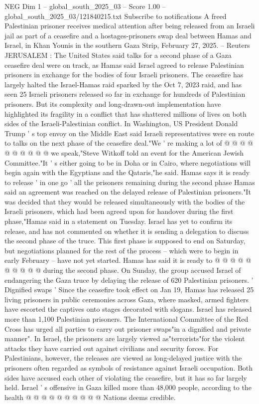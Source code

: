 \begin{textsample}{NEG Dim 1 – global\_south\_2025\_03 – Score 1.00 – global\_south\_2025\_03/121840215.txt}  \label{ex:f1_neg_161}
Subscribe to notifications A freed Palestinian prisoner receives medical attention after being released from an Israeli jail as part of a ceasefire and a hostages-prisoners swap deal between Hamas and Israel, in Khan Younis in the southern Gaza Strip, February 27, 2025. -- Reuters JERUSALEM : The United States said talks for a second phase of a Gaza ceasefire deal were on track, as Hamas said Israel agreed to release Palestinian prisoners in exchange for the bodies of four Israeli prisoners.
The ceasefire has largely halted the Israel-Hamas raid sparked by the Oct 7, 2023 raid, and has seen 25 Israeli prisoners released so far in exchange for hundreds of Palestinian prisoners.
But its complexity and long-drawn-out implementation have highlighted its fragility in a conflict that has shattered millions of lives on both sides of the Israeli-Palestinian conflict.
In Washington, US President Donald Trump ' s top envoy on the Middle East said Israeli representatives were en route to talks on the next phase of the ceasefire deal."We ' re making a lot of @ @ @ @ @ @ @ @ @ @ we speak,"Steve Witkoff told an event for the American Jewish Committee."It ' s either going to be in Doha or in Cairo, where negotiations will begin again with the Egyptians and the Qataris,"he said.
Hamas says it is ready to release ' in one go ' all the prisoners remaining during the second phase Hamas said an agreement was reached on the delayed release of Palestinian prisoners."It was decided that they would be released simultaneously with the bodies of the Israeli prisoners, which had been agreed upon for handover during the first phase,"Hamas said in a statement on Tuesday.
Israel has yet to confirm its release, and has not commented on whether it is sending a delegation to discuss the second phase of the truce.
This first phase is supposed to end on Saturday, but negotiations planned for the rest of the process -- which were to begin in early February -- have not yet started.
Hamas has said it is ready to @ @ @ @ @ @ @ @ @ @ during the second phase.
On Sunday, the group accused Israel of endangering the Gaza truce by delaying the release of 620 Palestinian prisoners. ' Dignified swaps ' Since the ceasefire took effect on Jan 19, Hamas has released 25 living prisoners in public ceremonies across Gaza, where masked, armed fighters have escorted the captives onto stages decorated with slogans.
Israel has released more than 1,100 Palestinian prisoners.
The International Committee of the Red Cross has urged all parties to carry out prisoner swaps"in a dignified and private manner".
In Israel, the prisoners are largely viewed as"terrorists"for the violent attacks they have carried out against civilians and security forces.
For Palestinians, however, the releases are viewed as long-delayed justice with the prisoners often regarded as symbols of resistance against Israeli occupation.
Both sides have accused each other of violating the ceasefire, but it has so far largely held.
Israel ' s offensive in Gaza killed more than 48,000 people, according to the health @ @ @ @ @ @ @ @ @ @ Nations deems credible.

\end{textsample}

